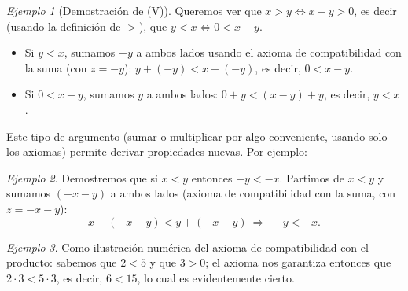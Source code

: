 \documentclass[11pt]{article}
\theoremstyle{remark}
\newtheorem*{ejemplo}{Ejemplo}
\begin{document}
\begin{ejemplo}[Demostración de (V)]
Queremos ver que $x>y \iff x-y>0$, es decir (usando la definición de $>$),
que $y<x \iff 0<x-y$.
\begin{itemize}
\item[$(\Rightarrow)$] Si $y<x$, sumamos $-y$ a ambos lados usando el axioma
de compatibilidad con la suma (con $z=-y$): $y+(-y) < x+(-y)$, es decir,
$0 < x-y$.
\item[$(\Leftarrow)$] Si $0<x-y$, sumamos $y$ a ambos lados: $0+y < (x-y)+y$,
es decir, $y<x$.
\end{itemize}
\end{ejemplo}

Este tipo de argumento (sumar o multiplicar por algo conveniente, usando
solo los axiomas) permite derivar propiedades nuevas. Por ejemplo:

\begin{ejemplo}
Demostremos que si $x<y$ entonces $-y<-x$. Partimos de $x<y$ y sumamos
$(-x-y)$ a ambos lados (axioma de compatibilidad con la suma, con
$z=-x-y$):
$$x+(-x-y) < y+(-x-y) \ \Longrightarrow\ -y < -x.$$
\end{ejemplo}

\begin{ejemplo}
Como ilustración numérica del axioma de compatibilidad con el producto:
sabemos que $2<5$ y que $3>0$; el axioma nos garantiza entonces que
$2\cdot 3 < 5 \cdot 3$, es decir, $6<15$, lo cual es evidentemente cierto.
\end{ejemplo}
\end{document}
